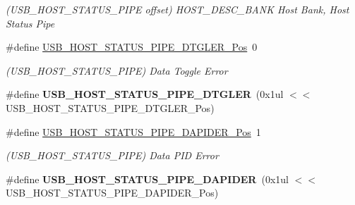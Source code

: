 \begin{DoxyCompactItemize}
\begin{DoxyCompactList}\small\item\em (U\+S\+B\+\_\+\+H\+O\+S\+T\+\_\+\+S\+T\+A\+T\+U\+S\+\_\+\+P\+I\+P\+E offset) H\+O\+S\+T\+\_\+\+D\+E\+S\+C\+\_\+\+B\+A\+N\+K Host Bank, Host Status Pipe \end{DoxyCompactList}\item 
\hypertarget{group___s_a_m_l21___u_s_b_ga93d07e3d08d1fb4add66e964989ca46d}{}\#define \hyperlink{group___s_a_m_l21___u_s_b_ga93d07e3d08d1fb4add66e964989ca46d}{U\+S\+B\+\_\+\+H\+O\+S\+T\+\_\+\+S\+T\+A\+T\+U\+S\+\_\+\+P\+I\+P\+E\+\_\+\+D\+T\+G\+L\+E\+R\+\_\+\+Pos}~0\label{group___s_a_m_l21___u_s_b_ga93d07e3d08d1fb4add66e964989ca46d}

\begin{DoxyCompactList}\small\item\em (U\+S\+B\+\_\+\+H\+O\+S\+T\+\_\+\+S\+T\+A\+T\+U\+S\+\_\+\+P\+I\+P\+E) Data Toggle Error \end{DoxyCompactList}\item 
\hypertarget{group___s_a_m_l21___u_s_b_gaf3429010f4d20e6aef1e800e457b51a3}{}\#define {\bfseries U\+S\+B\+\_\+\+H\+O\+S\+T\+\_\+\+S\+T\+A\+T\+U\+S\+\_\+\+P\+I\+P\+E\+\_\+\+D\+T\+G\+L\+E\+R}~(0x1ul $<$$<$ U\+S\+B\+\_\+\+H\+O\+S\+T\+\_\+\+S\+T\+A\+T\+U\+S\+\_\+\+P\+I\+P\+E\+\_\+\+D\+T\+G\+L\+E\+R\+\_\+\+Pos)\label{group___s_a_m_l21___u_s_b_gaf3429010f4d20e6aef1e800e457b51a3}

\item 
\hypertarget{group___s_a_m_l21___u_s_b_gafa8f2dc77b052cf914a9ce0cb42fb969}{}\#define \hyperlink{group___s_a_m_l21___u_s_b_gafa8f2dc77b052cf914a9ce0cb42fb969}{U\+S\+B\+\_\+\+H\+O\+S\+T\+\_\+\+S\+T\+A\+T\+U\+S\+\_\+\+P\+I\+P\+E\+\_\+\+D\+A\+P\+I\+D\+E\+R\+\_\+\+Pos}~1\label{group___s_a_m_l21___u_s_b_gafa8f2dc77b052cf914a9ce0cb42fb969}

\begin{DoxyCompactList}\small\item\em (U\+S\+B\+\_\+\+H\+O\+S\+T\+\_\+\+S\+T\+A\+T\+U\+S\+\_\+\+P\+I\+P\+E) Data P\+I\+D Error \end{DoxyCompactList}\item 
\hypertarget{group___s_a_m_l21___u_s_b_gaddb2bce5092ee53c61710f9893baa788}{}\#define {\bfseries U\+S\+B\+\_\+\+H\+O\+S\+T\+\_\+\+S\+T\+A\+T\+U\+S\+\_\+\+P\+I\+P\+E\+\_\+\+D\+A\+P\+I\+D\+E\+R}~(0x1ul $<$$<$ U\+S\+B\+\_\+\+H\+O\+S\+T\+\_\+\+S\+T\+A\+T\+U\+S\+\_\+\+P\+I\+P\+E\+\_\+\+D\+A\+P\+I\+D\+E\+R\+\_\+\+Pos)\label{group___s_a_m_l21___u_s_b_gaddb2bce5092ee53c61710f9893baa788}


\end{DoxyCompactItemize}
